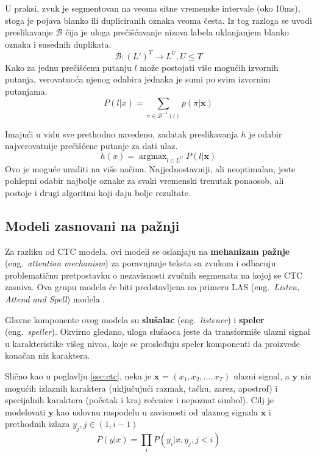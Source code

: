 \documentclass[a4paper]{article}
\DeclareMathOperator*{\argmax}{argmax}
\begin{document}
U praksi, zvuk je segmentovan na veoma sitne vremenske intervale (oko 10ms), stoga je pojava blanko ili dupliciranih oznaka veoma česta. 
Iz tog razloga se uvodi preslikavanje $\mathcal{B}$ čija je uloga prečišćavanje nizova labela uklanjanjem blanko oznaka i susednih duplikata.
\begin{equation*}
  \mathcal{B}: (L')^T \rightarrow L^U, U \leq T
\end{equation*}
Kako za jednu prečišćenu putanju $l$ može postojati više mogućih izvornih putanja, verovatnoća njenog odabira jednaka je sumi po svim izvornim putanjama.
\begin{equation}
\label{eq:beta}
  P(l | x) = \sum_{\pi \in \mathcal{B}^{-1}(l)} p(\pi | \textbf{x})
\end{equation}

Imajući u vidu sve prethodno navedeno, zadatak preslikavanja $h$ je odabir najverovatnije prečišćene putanje za dati ulaz.
\begin{equation}
\label{eq:h_x}
  h(x) = \argmax_{l \in L^U} P(l | \textbf{x})
\end{equation}
Ovo je moguće uraditi na više načina.
Najjednostavniji, ali neoptimalan, jeste pohlepni odabir najbolje oznake za svaki vremenski trenutak ponaosob, ali postoje i drugi algoritmi koji daju bolje rezultate.


\subsection{Modeli zasnovani na pažnji}

Za razliku od CTC modela, ovi modeli se oslanjaju na \textbf{mehanizam pažnje} (eng.~{\em attention mechanism}) za poravnjanje teksta sa zvukom i odbacuju problematičnu pretpostavku o nezavisnosti zvučnih segmenata na kojoj se CTC zasniva.
Ova grupu modela će biti predstavljena na primeru LAS (eng.~{\em Listen, Attend and Spell}) modela \cite{chan2015las}. 

Glavne komponente ovog modela su \textbf{slušalac} (eng.~{\em listener}) i \textbf{speler} (eng.~{\em speller}).
Okvirno gledano, uloga slušaoca jeste da transformiše ulazni signal u karakteristike višeg nivoa, koje se prosleđuju speler komponenti da proizvede konačan niz karaktera. 

Slično kao u poglavlju \ref{sec:ctc}, neka je $\textbf{x}$ = $(x_1,  x_2,  ...,  x_T)$ ulazni signal, a $\textbf{y}$ niz mogućih izlaznih karaktera (uključujući razmak, tačku, zarez, apostrof) i specijalnih karaktera (početak i kraj rečenice i nepoznat simbol).
Cilj je modelovati $\textbf{y}$ kao uslovnu raspodelu u zavisnosti od ulaznog signala $\textbf{x}$ i prethodnih izlaza $y_j,  j \in (1,  i-1)$
\begin{equation}
  \label{eq:chain}
  P(y | x) = \prod_i P(y_i | x, y_j, j < i)
\end{equation}
\end{document}
